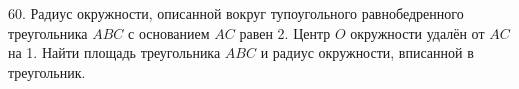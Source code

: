 60. Радиус окружности, описанной вокруг тупоугольного равнобедренного треугольника $ABC$ с основанием $AC$ равен 2. Центр $O$ окружности удалён от $AC$ на 1. Найти площадь треугольника $ABC$ и радиус окружности, вписанной в треугольник.\\
